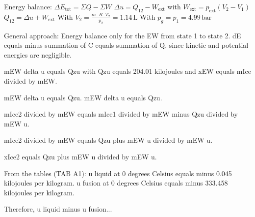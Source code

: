 Energy balance: \( \Delta E_{\text{tot}} = \Sigma Q - \Sigma W \)  
\( \Delta u = Q_{12} - W_{\text{ext}} \) with \( W_{\text{ext}} = p_{\text{ext}} (V_2 - V_1) \)  
\( Q_{12} = \Delta u + W_{\text{ext}} \)  
With \( V_2 = \frac{m \cdot R \cdot T_2}{p_2} = 1.14 \, \text{L} \)  
With \( p_g = p_1 = 4.99 \, \text{bar} \)

General approach:  
Energy balance only for the EW from state 1 to state 2.  
dE equals minus summation of C equals summation of Q, since kinetic and potential energies are negligible.  

mEW delta u equals Qzu with Qzu equals 204.01 kilojoules and xEW equals mIce divided by mEW.  

mEW delta u equals Qzu.  
mEW delta u equals Qzu.  

mIce2 divided by mEW equals mIce1 divided by mEW minus Qzu divided by mEW u.  

mIce2 divided by mEW equals Qzu plus mEW u divided by mEW u.  

xIce2 equals Qzu plus mEW u divided by mEW u.  

From the tables (TAB A1):  
u liquid at 0 degrees Celsius equals minus 0.045 kilojoules per kilogram.  
u fusion at 0 degrees Celsius equals minus 333.458 kilojoules per kilogram.  

Therefore, u liquid minus u fusion...